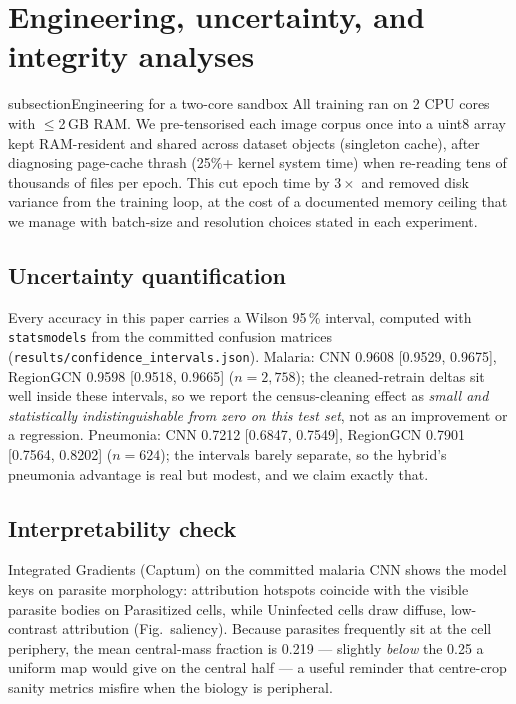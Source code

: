 \section{Engineering, uncertainty, and integrity analyses}
subsection{Engineering for a two-core sandbox}
All training ran on 2 CPU cores with $\leq$2\,GB RAM. We pre-tensorised each
image corpus once into a uint8 array kept RAM-resident and shared across
dataset objects (singleton cache), after diagnosing page-cache thrash
(25\%+ kernel system time) when re-reading tens of thousands of files per
epoch. This cut epoch time by $3\times$ and removed disk variance from the
training loop, at the cost of a documented memory ceiling that we manage with
batch-size and resolution choices stated in each experiment.
\subsection{Uncertainty quantification}
Every accuracy in this paper carries a Wilson 95\,\% interval, computed
with \texttt{statsmodels} from the committed confusion matrices
(\texttt{results/confidence\_intervals.json}). Malaria: CNN
0.9608 [0.9529, 0.9675], RegionGCN 0.9598 [0.9518, 0.9665] ($n{=}2{,}758$);
the cleaned-retrain deltas sit well inside these intervals, so we report
the census-cleaning effect as \emph{small and statistically
indistinguishable from zero on this test set}, not as an improvement or a
regression. Pneumonia: CNN 0.7212 [0.6847, 0.7549], RegionGCN 0.7901
[0.7564, 0.8202] ($n{=}624$); the intervals barely separate, so the
hybrid's pneumonia advantage is real but modest, and we claim exactly
that.
\subsection{Interpretability check}
Integrated Gradients (Captum) on the committed malaria CNN shows the
model keys on parasite morphology: attribution hotspots coincide with
the visible parasite bodies on Parasitized cells, while Uninfected
cells draw diffuse, low-contrast attribution (Fig.~saliency). Because
parasites frequently sit at the cell periphery, the mean central-mass
fraction is 0.219 --- slightly \emph{below} the 0.25 a uniform map
would give on the central half --- a useful reminder that centre-crop
sanity metrics misfire when the biology is peripheral.
